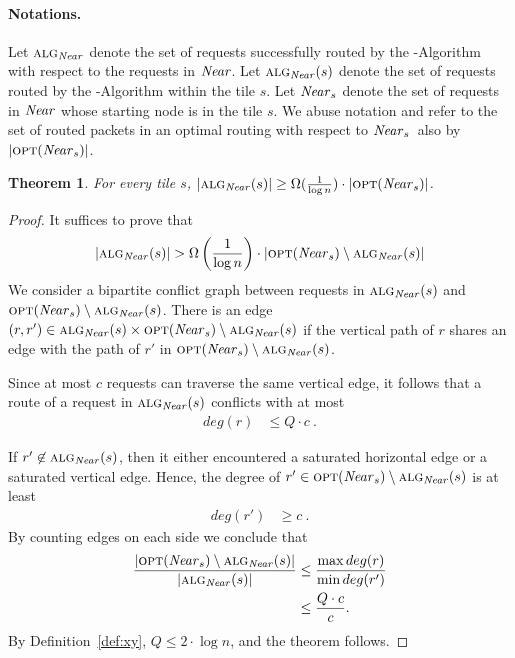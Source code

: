 \documentclass[11pt]{article}
\newtheorem{theorem}{Theorem}
\newcommand{\opt}{\text{\textsc{opt}}}
\newcommand{\alg}{\text{\sc{alg}}}
\newenvironment{proof sketch}[1]{\noindent {\emph{Proof sketch of #1:}}}{\hfill \qed}
\newcommand{\near}{\text{\emph{Near}}}
\newcommand{\algn}{\alg_{\near}}
\newcommand{\vl}{Q}
\begin{document}
\paragraph{Notations.}
Let $\algn$ denote the set of requests successfully routed by the \near-Algorithm
with respect to the requests in $\near$.  Let $\algn (s)$ denote the set of requests
routed by the \near-Algorithm within the tile $s$. Let $\near_s$ denote the set of
requests in $\near$ whose starting node is in the tile $s$. We abuse notation and
refer to the set of routed packets in an optimal routing with respect to $\near_s$\
also by $|\opt(\near_s)|$.

\begin{theorem} \label{thm:near}
For every tile $s$,
  $|\algn(s)| \geq \Omega(\frac {1}{\log n}) \cdot |\opt({\near}_s)|$.
\end{theorem}



\begin{proof}
    It suffices to prove that
\begin{align*}
  |\algn(s)| > \Omega \left(\frac {1}{\log n}\right) \cdot | \opt(\near_s)\setminus \algn(s)|
\end{align*}
We consider a bipartite conflict graph between requests in $\algn(s)$
and $\opt(\near_s)\setminus \algn(s)$. There is an edge $(r,r')\in \algn(s)\times \opt(\near_s)\setminus \algn(s)$ if
the vertical path of $r$ shares an edge with the path of $r'$ in $\opt(\near_s)\setminus \algn(s)$.

Since at most $c$ requests  can traverse the same vertical
edge, it follows that a route of a request in $\algn(s)$
conflicts with at most
\begin{align*}
  deg(r) & \leq \vl\cdot c\:.
\end{align*}

If $r' \not \in \algn(s)$, then it either encountered a saturated
horizontal edge or a saturated vertical edge. Hence, the degree of
$r'\in \opt(\near_s)\setminus \algn(s)$ is at least
\begin{align*}
  deg(r') &\geq c\:.
\end{align*}
By counting edges on each side we conclude that
\begin{align*}
  \frac{ | \opt(\near_s)\setminus \algn(s)|}{ |\algn(s)|} & \leq
  \frac{\max deg(r)}{\min deg(r')}\\
  &\leq \frac{\vl\cdot c}{c}.
\end{align*}
By Definition~\ref{def:xy}, $\vl \leq 2 \cdot \log n$, and
the theorem follows.
\end{proof}
\end{document}
